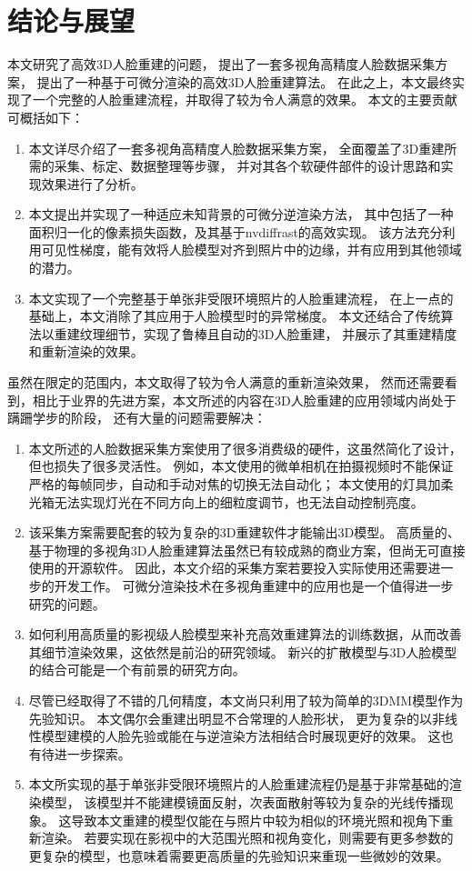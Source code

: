 \documentclass{scutmaster}
\begin{document}






{
\backmatter
\chapter{结论与展望}
\label{chap:conclusion}

本文研究了高效3D人脸重建的问题，
提出了一套多视角高精度人脸数据采集方案，
提出了一种基于可微分渲染的高效3D人脸重建算法。
在此之上，本文最终实现了一个完整的人脸重建流程，并取得了较为令人满意的效果。
本文的主要贡献可概括如下：
\begin{enumerate}
\item 本文详尽介绍了一套多视角高精度人脸数据采集方案，
全面覆盖了3D重建所需的采集、标定、数据整理等步骤，
并对其各个软硬件部件的设计思路和实现效果进行了分析。
\item 本文提出并实现了一种适应未知背景的可微分逆渲染方法，
其中包括了一种面积归一化的像素损失函数，及其基于nvdiffrast的高效实现。
该方法充分利用可见性梯度，能有效将人脸模型对齐到照片中的边缘，并有应用到其他领域的潜力。
\item 本文实现了一个完整基于单张非受限环境照片的人脸重建流程，
在上一点的基础上，本文消除了其应用于人脸模型时的异常梯度。
本文还结合了传统算法以重建纹理细节，实现了鲁棒且自动的3D人脸重建，
并展示了其重建精度和重新渲染的效果。
\end{enumerate}

虽然在限定的范围内，本文取得了较为令人满意的重新渲染效果，
然而还需要看到，相比于业界的先进方案，本文所述的内容在3D人脸重建的应用领域内尚处于蹒跚学步的阶段，
还有大量的问题需要解决：
\begin{enumerate}
\item 本文所述的人脸数据采集方案使用了很多消费级的硬件，这虽然简化了设计，但也损失了很多灵活性。
例如，本文使用的微单相机在拍摄视频时不能保证严格的每帧同步，自动和手动对焦的切换无法自动化；
本文使用的灯具加柔光箱无法实现灯光在不同方向上的细粒度调节，也无法自动控制亮度。
\item 该采集方案需要配套的较为复杂的3D重建软件才能输出3D模型。
高质量的、基于物理的多视角3D人脸重建算法虽然已有较成熟的商业方案，但尚无可直接使用的开源软件。
因此，本文介绍的采集方案若要投入实际使用还需要进一步的开发工作。
可微分渲染技术在多视角重建中的应用也是一个值得进一步研究的问题。
\item 如何利用高质量的影视级人脸模型来补充高效重建算法的训练数据，从而改善其细节渲染效果，这依然是前沿的研究领域。
新兴的扩散模型与3D人脸模型的结合可能是一个有前景的研究方向。
\item 尽管已经取得了不错的几何精度，本文尚只利用了较为简单的3DMM模型作为先验知识。
本文偶尔会重建出明显不合常理的人脸形状，
更为复杂的以非线性模型建模的人脸先验或能在与逆渲染方法相结合时展现更好的效果。
这也有待进一步探索。
\item 本文所实现的基于单张非受限环境照片的人脸重建流程仍是基于非常基础的渲染模型，
该模型并不能建模镜面反射，次表面散射等较为复杂的光线传播现象。
这导致本文重建的模型仅能在与照片中较为相似的环境光照和视角下重新渲染。
若要实现在影视中的大范围光照和视角变化，则需要有更多参数的更复杂的模型，也意味着需要更高质量的先验知识来重现一些微妙的效果。
\end{enumerate}

}
\end{document}
